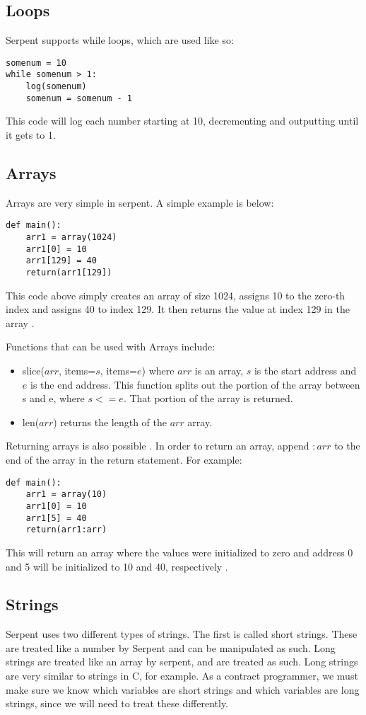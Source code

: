 \documentclass[12pt]{article}
\begin{document}
\subsection{Loops}
Serpent supports while loops, which are used like so:
\begin{verbatim}
somenum = 10
while somenum > 1:
	log(somenum)
	somenum = somenum - 1
\end{verbatim}

This code will log each number starting at 10, decrementing and outputting until it gets to 1. \cite{Serpent1.0(old)}

\subsection{Arrays}
Arrays are very simple in serpent. A simple example is below:
\begin{verbatim}
def main():
	arr1 = array(1024)
	arr1[0] = 10
	arr1[129] = 40
	return(arr1[129])
\end{verbatim}

This code above simply creates an array of size 1024, assigns 10 to the zero-th index and assigns 40 to index 129. It then returns the value at index 129 in the array \cite{Serpent,Serpent1.0(old)}. 

Functions that can be used with Arrays include:
\begin{itemize}
	\item slice($arr$, items=$s$, items=$e$) where $arr$ is an array, $s$ is the start address and $e$ is the end address. This function splits out the portion of the array between s and e, where $s <= e$. That portion of the array is returned.
	\item len($arr$) returns the length of the $arr$ array.
\end{itemize}

Returning arrays is also possible \cite{Serpent}. In order to return an array, append $:arr$ to the end of the array in the return statement. For example:

\begin{verbatim}
def main():
	arr1 = array(10)
	arr1[0] = 10
	arr1[5] = 40
	return(arr1:arr)
\end{verbatim}

This will return an array where the values were initialized to zero and address 0 and 5 will be initialized to 10 and 40, respectively \cite{Serpent}. 

\subsection{Strings}
	Serpent uses two different types of strings. The first is called short strings. These are treated like a number by Serpent and can be manipulated as such. Long strings are treated like an array by serpent, and are treated as such. Long strings are very similar to strings in C, for example. As a contract programmer, we must make sure we know which variables are short strings and which variables are long strings, since we will need to treat these differently. \cite{Serpent}
\end{document}
